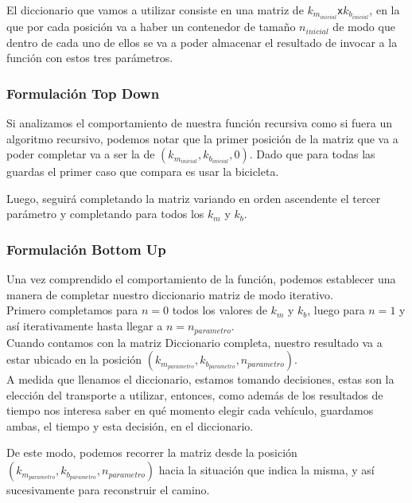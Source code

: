 El diccionario que vamos a utilizar consiste en una matriz de $k_{m_{inicial}}$\texttt{x}$k_{b_{inicial}}$, en la que por cada posici\'on va a haber un contenedor de tama\~no $n_{inicial}$ de modo que dentro de cada uno de ellos se va a poder almacenar el resultado de invocar a la funci\'on con estos tres par\'ametros.

\subsubsection*{Formulaci\'on Top Down}

	Si analizamos el comportamiento de nuestra funci\'on recursiva como si fuera un algoritmo recursivo, podemos notar que la primer posici\'on de la matriz que va a poder completar va a ser la de $(k_{m_{inicial}},k_{b_{inicial}},0)$. Dado que para todas las guardas el primer caso que compara es usar la bicicleta.

	Luego, seguir\'a completando la matriz variando en orden ascendente el tercer par\'ametro y completando para todos los $k_m$ y $k_b$.

\subsubsection*{Formulaci\'on Bottom Up}

Una vez comprendido el comportamiento de la funci\'on, podemos establecer una manera de completar nuestro diccionario matriz de modo iterativo.\\

Primero completamos para $n=0$ todos los valores de $k_m$ y $k_b$, luego para $n=1$ y as\'i iterativamente hasta llegar a $n=n_{parametro}$.\\

Cuando contamos con la matriz Diccionario completa, nuestro resultado va a estar ubicado en la posici\'on $(k_{m_{parametro}},k_{b_{parametro}},n_{parametro})$.\\

A medida que llenamos el diccionario, estamos tomando decisiones, estas son la elecci\'on del transporte a utilizar, entonces, como adem\'as de los resultados de tiempo nos interesa saber en qu\'e momento elegir cada veh\'iculo, guardamos ambas, el tiempo y esta decisi\'on, en el diccionario.

De este modo, podemos recorrer la matriz  desde la posici\'on $(k_{m_{parametro}},k_{b_{parametro}},n_{parametro})$ hacia la situaci\'on que indica la misma, y as\'i sucesivamente para reconstruir el camino.

